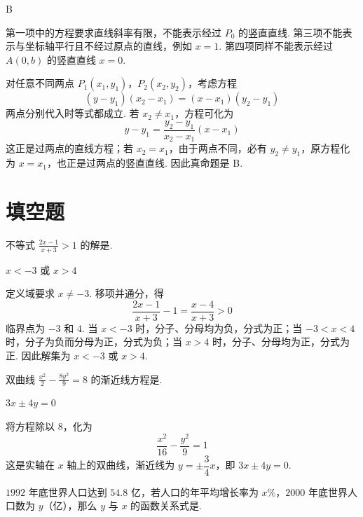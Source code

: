 \begin{answer}
B
\end{answer}

\begin{solution}
第一项中的方程要求直线斜率有限，不能表示经过 \(P_0\) 的竖直直线. 第三项不能表示与坐标轴平行且不经过原点的直线，例如 \(x=1\). 第四项同样不能表示经过 \(A(0,b)\) 的竖直直线 \(x=0\).

对任意不同两点 \(P_1(x_1,y_1)\)，\(P_2(x_2,y_2)\)，考虑方程
\[
(y-y_1)(x_2-x_1)=(x-x_1)(y_2-y_1)
\]
两点分别代入时等式都成立. 若 \(x_2\ne x_1\)，方程可化为
\[
y-y_1=\frac{y_2-y_1}{x_2-x_1}(x-x_1)
\]
这正是过两点的直线方程；若 \(x_2=x_1\)，由于两点不同，必有 \(y_2\ne y_1\)，原方程化为 \(x=x_1\)，也正是过两点的竖直直线. 因此真命题是 B.
\end{solution}

\section{填空题}

\begin{problem}
不等式 \(\frac{2x-1}{x+3}>1 \) 的解是\fillinblank{}.
\end{problem}

\begin{answer}
\(x<-3\) 或 \(x>4\)
\end{answer}

\begin{solution}
定义域要求 \(x\ne-3\). 移项并通分，得
\[
\frac{2x-1}{x+3}-1=\frac{x-4}{x+3}>0
\]
临界点为 \(-3\) 和 \(4\). 当 \(x<-3\) 时，分子、分母均为负，分式为正；当 \(-3<x<4\) 时，分子为负而分母为正，分式为负；当 \(x>4\) 时，分子、分母均为正，分式为正. 因此解集为 \(x<-3\) 或 \(x>4\).
\end{solution}

\begin{problem}
双曲线 \(\frac{x^{2}}{2}-\frac{8y^{2}}{9}=8 \) 的渐近线方程是\fillinblank{}.
\end{problem}

\begin{answer}
\(3x\pm4y=0\)
\end{answer}

\begin{solution}
将方程除以 \(8\)，化为
\[
\frac{x^2}{16}-\frac{y^2}{9}=1
\]
这是实轴在 \(x\) 轴上的双曲线，渐近线为 \(y=\pm\dfrac{3}{4}x\)，即 \(3x\pm4y=0\).
\end{solution}

\begin{problem}
\(1992\) 年底世界人口达到 \(54.8\text{ 亿}\)，若人口的年平均增长率为 \(x\%\)，\(2000\) 年底世界人口数为 \(y\)（\(\text{亿}\)），那么 \(y\) 与 \(x\) 的函数关系式是\fillinblank{}.
\end{problem}

